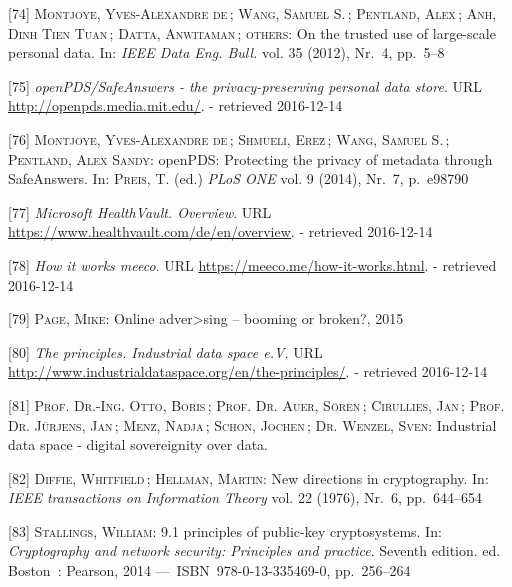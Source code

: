 \documentclass[12pt,english,a4paper,titlepage,cleardoublepage=empty,dottedtoc]{report}
\begin{document}
\hypertarget{ref-paper_2012_openpds_on-trusted-use-of-large-scale-personal-data}{}
{[}74{]} \textsc{Montjoye, Yves-Alexandre de}\,; \textsc{Wang, Samuel
S.}\,; \textsc{Pentland, Alex}\,; \textsc{Anh, Dinh Tien Tuan}\,;
\textsc{Datta, Anwitaman}\,; \textsc{others}: On the trusted use of
large-scale personal data. In: \emph{IEEE Data Eng. Bull.} vol. 35
(2012), Nr.~4, pp.~5--8

\hypertarget{ref-web_mit_openpds-safeanswers-project-page}{}
{[}75{]} \emph{openPDS/SafeAnswers - the privacy-preserving personal
data store}. URL \url{http://openpds.media.mit.edu/}. - retrieved
2016-12-14

\hypertarget{ref-paper_2014_openpds_protecting-privacy-of-meta-data-through-safeanswers}{}
{[}76{]} \textsc{Montjoye, Yves-Alexandre de}\,; \textsc{Shmueli,
Erez}\,; \textsc{Wang, Samuel S.}\,; \textsc{Pentland, Alex Sandy}:
openPDS: Protecting the privacy of metadata through SafeAnswers. In:
\textsc{Preis, T.} (ed.) \emph{PLoS ONE} vol. 9 (2014), Nr.~7, p.~e98790

\hypertarget{ref-web_microsoft_healthvault}{}
{[}77{]} \emph{Microsoft HealthVault. Overview}. URL
\url{https://www.healthvault.com/de/en/overview}. - retrieved 2016-12-14

\hypertarget{ref-web_meeco_how-it-works}{}
{[}78{]} \emph{How it works meeco}. URL
\url{https://meeco.me/how-it-works.html}. - retrieved 2016-12-14

\hypertarget{ref-slides_2015_meeco-case-study}{}
{[}79{]} \textsc{Page, Mike}: Online adver\textgreater{}sing -- booming
or broken?, 2015

\hypertarget{ref-web_industrial-data-space}{}
{[}80{]} \emph{The principles. Industrial data space e.V.} URL
\url{http://www.industrialdataspace.org/en/the-principles/}. - retrieved
2016-12-14

\hypertarget{ref-whitepaper_2016_industrial-data-space}{}
{[}81{]} \textsc{Prof. Dr.-Ing. Otto, Boris}\,; \textsc{Prof. Dr. Auer,
Sören}\,; \textsc{Cirullies, Jan}\,; \textsc{Prof. Dr. Jürjens, Jan}\,;
\textsc{Menz, Nadja}\,; \textsc{Schon, Jochen}\,; \textsc{Dr. Wenzel,
Sven}: Industrial data space - digital sovereignity over data.

\hypertarget{ref-paper_1976_d-h-key-exchange}{}
{[}82{]} \textsc{Diffie, Whitfield}\,; \textsc{Hellman, Martin}: New
directions in cryptography. In: \emph{IEEE transactions on Information
Theory} vol. 22 (1976), Nr.~6, pp.~644--654

\hypertarget{ref-book_2014_chapter-9-1-public-key-crypto}{}
{[}83{]} \textsc{Stallings, William}: 9.1 principles of public-key
cryptosystems. In: \emph{Cryptography and network security: Principles
and practice}. Seventh edition. ed. Boston~: Pearson, 2014
---~ISBN~978-0-13-335469-0, pp.~256--264
\end{document}
